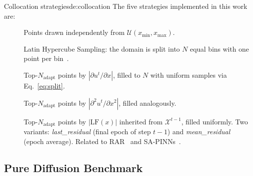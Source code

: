 \begin{De}{Collocation strategies}{de:collocation}
The five strategies implemented in this work are:
\begin{description}
  \item[]
    Points drawn independently from $\mathcal{U}(x_\min, x_\max)$.

  \item[]
    Latin Hypercube Sampling: the domain is split into $N$ equal bins with one
    point per bin~\cite{Lu2019}.

  \item[]
    Top-$N_\text{adapt}$ points by $|\partial u^t/\partial x|$, filled to $N$
    with uniform samples via Eq.~\eqref{eq:split}.

  \item[]
    Top-$N_\text{adapt}$ points by $|\partial^2 u^t/\partial x^2|$, filled
    analogously.

  \item[]
    Top-$N_\text{adapt}$ points by $|\mathrm{LF}(x)|$ inherited from
    $\mathcal{X}^{t-1}$, filled uniformly. Two variants:
    \textit{last\_residual} (final epoch of step $t{-}1$) and
    \textit{mean\_residual} (epoch average). Related to RAR~\cite{Lu2019} and
    SA-PINNs~\cite{McClenny2021}.
\end{description}
\end{De}

\subsection{Pure Diffusion Benchmark}
\label{subsec:colloc_diffusion}

